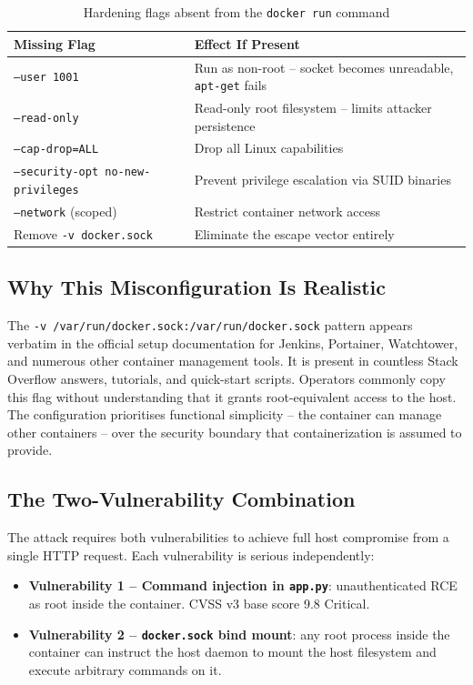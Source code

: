 \begin{table}[h]
\centering
\caption{Hardening flags absent from the \texttt{docker run} command}
\label{tab:missing_flags}
\begin{tabular}{|l|l|}
\hline
\textbf{Missing Flag} & \textbf{Effect If Present} \\
\hline
\texttt{--user 1001} & Run as non-root -- socket becomes unreadable, \texttt{apt-get} fails \\
\texttt{--read-only} & Read-only root filesystem -- limits attacker persistence \\
\texttt{--cap-drop=ALL} & Drop all Linux capabilities \\
\texttt{--security-opt no-new-privileges} & Prevent privilege escalation via SUID binaries \\
\texttt{--network} (scoped) & Restrict container network access \\
Remove \texttt{-v docker.sock} & Eliminate the escape vector entirely \\
\hline
\end{tabular}
\end{table}

\subsection*{Why This Misconfiguration Is Realistic}

The \texttt{-v /var/run/docker.sock:/var/run/docker.sock} pattern appears verbatim in the official setup documentation for Jenkins, Portainer, Watchtower, and numerous other container management tools. It is present in countless Stack Overflow answers, tutorials, and quick-start scripts. Operators commonly copy this flag without understanding that it grants root-equivalent access to the host. The configuration prioritises functional simplicity -- the container can manage other containers -- over the security boundary that containerization is assumed to provide.

\subsection*{The Two-Vulnerability Combination}

The attack requires both vulnerabilities to achieve full host compromise from a single HTTP request. Each vulnerability is serious independently:

\begin{itemize}
    \item \textbf{Vulnerability 1 -- Command injection in \texttt{app.py}}: unauthenticated RCE as root inside the container. CVSS v3 base score 9.8 Critical.
    \item \textbf{Vulnerability 2 -- \texttt{docker.sock} bind mount}: any root process inside the container can instruct the host daemon to mount the host filesystem and execute arbitrary commands on it.
\end{itemize}

